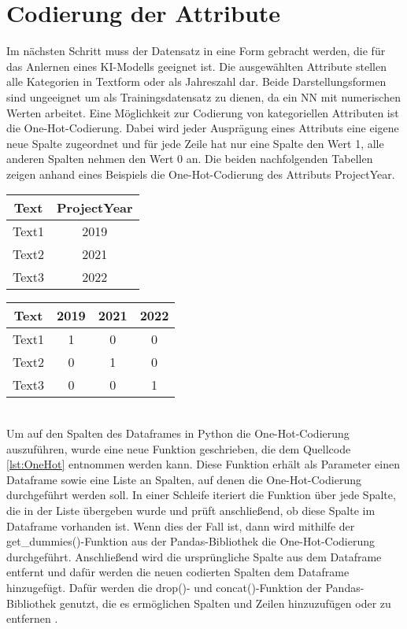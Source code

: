 \section{Codierung der Attribute}
Im nächsten Schritt muss der Datensatz in eine Form gebracht werden, die für das Anlernen eines \ac{KI}-Modells geeignet ist. Die ausgewählten Attribute stellen alle Kategorien in 
Textform oder als Jahreszahl dar. Beide Darstellungsformen sind ungeeignet um als Trainingsdatensatz zu dienen, da ein \ac{NN} mit numerischen Werten arbeitet. 
Eine Möglichkeit zur Codierung von kategoriellen Attributen ist die One-Hot-Codierung. Dabei wird jeder Ausprägung eines Attributs eine eigene neue Spalte zugeordnet 
und für jede Zeile hat nur eine Spalte den Wert 1, alle anderen Spalten nehmen den Wert 0 an. Die beiden nachfolgenden Tabellen zeigen anhand eines Beispiels die 
One-Hot-Codierung des Attributs \glqq ProjectYear\grqq{}.  
\\
\begin{minipage}[c]{0.5\textwidth}
    \centering
    \begin{tabular}{|c|c|}
        \hline
        \textbf{Text} & \textbf{ProjectYear}\\ \hline
        Text1&2019\\
        Text2&2021\\
        Text3&2022\\
        \hline
    \end{tabular}
\end{minipage}
\begin{minipage}[c]{0.5\textwidth}
    \centering
    \begin{tabular}{|c|c|c|c|}
        \hline
        \textbf{Text} & \textbf{2019} & \textbf{2021} & \textbf{2022}\\ \hline
        Text1 & 1 & 0 & 0\\
        Text2 & 0 & 1 & 0\\
        Text3 & 0 & 0 & 1\\
        \hline
    \end{tabular}
\end{minipage}
\\
Um auf den Spalten des Dataframes in Python die One-Hot-Codierung auszuführen, wurde eine neue Funktion geschrieben, die dem Quellcode \ref{lst:OneHot} entnommen werden kann.
Diese Funktion erhält als Parameter einen Dataframe sowie eine Liste an Spalten, auf denen die One-Hot-Codierung durchgeführt werden soll. In einer Schleife iteriert die Funktion 
über jede Spalte, die in der Liste übergeben wurde und prüft anschließend, ob diese Spalte im Dataframe vorhanden ist. Wenn dies der Fall ist, dann wird mithilfe der 
get\_dummies()-Funktion aus der Pandas-Bibliothek die One-Hot-Codierung durchgeführt. Anschließend wird die ursprüngliche Spalte aus dem Dataframe entfernt und dafür werden
die neuen codierten Spalten dem Dataframe hinzugefügt. Dafür werden die drop()- und concat()-Funktion der Pandas-Bibliothek genutzt, die es ermöglichen Spalten und Zeilen
hinzuzufügen oder zu entfernen \cite{PandasDoc}.

